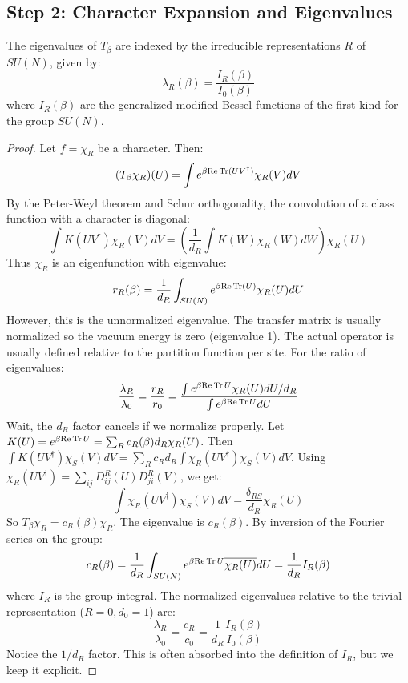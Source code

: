 \subsection{Step 2: Character Expansion and Eigenvalues}
\label{subsec:character-expansion}

\begin{theorem}
\label{thm:spectral-decomp}
The eigenvalues of $T_\beta$ are indexed by the irreducible representations $R$ of $SU(N)$, given by:
\begin{equation}
\lambda_R(\beta) = \frac{I_R(\beta)}{I_0(\beta)}
\end{equation}
where $I_R(\beta)$ are the generalized modified Bessel functions of the first kind for the group $SU(N)$.
\end{theorem}

\begin{proof}
Let $f = \chi_R$ be a character. Then:
\[
(T_\beta \chi_R)(U) = \int e^{\beta \mathrm{Re} \operatorname{Tr}(UV^\dagger)} \chi_R(V) dV
\]
By the Peter-Weyl theorem and Schur orthogonality, the convolution of a class function with a character is diagonal:
\[
\int K(UV^\dagger) \chi_R(V) dV = \left( \frac{1}{d_R} \int K(W) \chi_R(W) dW \right) \chi_R(U)
\]
Thus $\chi_R$ is an eigenfunction with eigenvalue:
\[
r_R(\beta) = \frac{1}{d_R} \int_{SU(N)} e^{\beta \mathrm{Re} \operatorname{Tr}(U)} \chi_R(U) dU
\]
However, this is the unnormalized eigenvalue. The transfer matrix is usually normalized so the vacuum energy is zero (eigenvalue 1). The actual operator is usually defined relative to the partition function per site. For the ratio of eigenvalues:
\[
\frac{\lambda_R}{\lambda_0} = \frac{r_R}{r_0} = \frac{\int e^{\beta \mathrm{Re} \operatorname{Tr} U} \chi_R(U) dU / d_R}{\int e^{\beta \mathrm{Re} \operatorname{Tr} U} dU}
\]
Wait, the $d_R$ factor cancels if we normalize properly.
Let $K(U) = e^{\beta \mathrm{Re} \operatorname{Tr} U} = \sum_R c_R(\beta) d_R \chi_R(U)$.
Then $\int K(UV^\dagger) \chi_S(V) dV = \sum_R c_R d_R \int \chi_R(U V^\dagger) \chi_S(V) dV$.
Using $\chi_R(UV^\dagger) = \sum_{ij} D_{ij}^R(U) \overline{D_{ji}^R(V)}$, we get:
\[
\int \chi_R(U V^\dagger) \chi_S(V) dV = \frac{\delta_{RS}}{d_R} \chi_R(U)
\]
So $T_\beta \chi_R = c_R(\beta) \chi_R$. The eigenvalue is $c_R(\beta)$.
By inversion of the Fourier series on the group:
\[
c_R(\beta) = \frac{1}{d_R} \int_{SU(N)} e^{\beta \mathrm{Re} \operatorname{Tr} U} \overline{\chi_R(U)} dU = \frac{1}{d_R} I_R(\beta)
\]
where $I_R$ is the group integral. The normalized eigenvalues relative to the trivial representation ($R=0, d_0=1$) are:
\[
\frac{\lambda_R}{\lambda_0} = \frac{c_R}{c_0} = \frac{1}{d_R} \frac{I_R(\beta)}{I_0(\beta)}
\]
Notice the $1/d_R$ factor. This is often absorbed into the definition of $I_R$, but we keep it explicit.
\end{proof}

